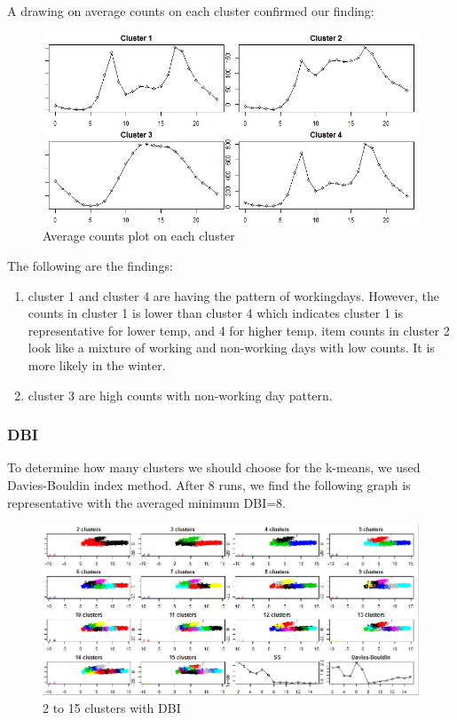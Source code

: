 \documentclass[12pt]{article}
\begin{document}
A drawing on average counts on each cluster confirmed our finding:
	\begin{figure}[H]
		\centering
		\includegraphics[scale=.65]{figures/kmeans_clusters.png}
		\caption{Average counts plot on each cluster}
	\end{figure}
The following are the findings:

\begin{enumerate}
	\item cluster 1 and cluster 4 are having the pattern of workingdays. However, the counts in cluster 1 is lower than cluster 4 which indicates cluster 1 is representative for lower temp, and 4 for higher temp.
	item counts in cluster 2 look like a mixture of working and non-working days with low counts. It is more likely in the winter.
	\item cluster 3 are high counts with non-working day pattern.
\end{enumerate}

\subsubsection{DBI}
To determine how many clusters we should choose for the k-means, we used Davies-Bouldin index method. After 8 runs, we find the following graph is representative with the averaged minimum DBI=8.
	\begin{figure}[H]
		\centering
		\includegraphics[scale=.65]{figures/dbi_8.png}
		\caption{2 to 15 clusters with DBI}
	\end{figure}
	
\end{document}
